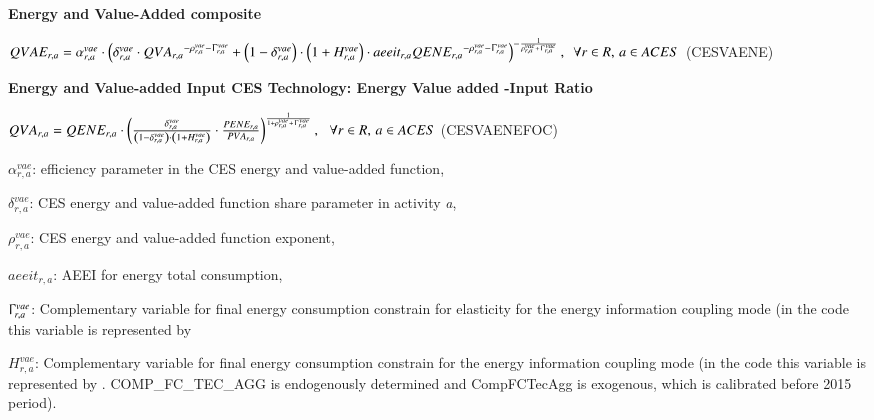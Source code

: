 \documentclass[10pt,a4paper,titlepage,dvipdfmx]{book}
\begin{document}
\begin{flushleft}\textbf{Energy and Value-Added composite}\end{flushleft}


\begin{center}  $QVAE_{r,a}=\alpha _{r,a}^{vae}\cdot \left(\delta _{r,a}^{vae}\cdot QV{A_{r,a}}^{-\rho _{r,a}^{vae}-\Upgamma _{r,a}^{vae}}+\left(1-\delta _{r,a}^{vae}\right)\cdot \left(1+H _{r,a}^{vae}\right)\cdot aeeit_{r,a}QEN{E_{r,a}}^{-\rho _{r,a}^{vae}-\Upgamma _{r,a}^{vae}}\right)^{-\frac{1}{\rho _{r,a}^{vae}+\Upgamma _{r,a}^{vae}}},\,\,\,\forall r\in R,\,a\in ACES$ (CESVAENE)
\end{center}

\begin{flushleft}\textbf{Energy and Value-added Input CES Technology: Energy \textendash{} Value added -Input Ratio}\end{flushleft}


\begin{center}  $QVA_{r,a}=QENE_{r,a}\cdot \left(\frac{\delta _{r,a}^{vae}}{\left(1-\delta _{r,a}^{vae}\right)\cdot \left(1+H _{r,a}^{vae}\right)}\cdot \frac{PENE_{r,a}}{PVA_{r,a}}\right)^{\frac{1}{1+\rho _{r,a}^{vae}+\Upgamma _{r,a}^{vae}}},\,\,\,\,\forall r\in R,\,a\in ACES$ (CESVAENEFOC)
\end{center}

\begin{flushleft}
$\alpha _{r,a}^{vae}$: efficiency parameter in the CES energy and value-added function,

$\delta _{r,a}^{vae}$: CES energy and value-added function share parameter in activity \textit{a},

$\rho _{r,a}^{vae}$: CES energy and value-added function exponent,

$aeeit_{r,a}$: AEEI for energy total consumption,

$\Upgamma _{r,a}^{vae}$: Complementary variable for final energy consumption constrain for elasticity for the energy information coupling mode (in the code this variable is represented by 

$H _{r,a}^{vae}$: Complementary variable for final energy consumption constrain for the energy information coupling mode (in the code this variable is represented by . COMP\_FC\_TEC\_AGG  is endogenously determined and CompFCTecAgg is exogenous, which is calibrated before 2015 period).
\end{flushleft}
\end{document}
